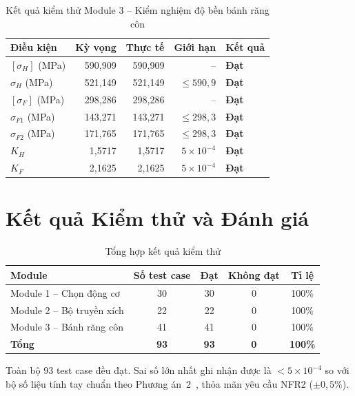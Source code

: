 \begin{table}[H]
  \centering
  \caption{Kết quả kiểm thử Module 3 -- Kiểm nghiệm độ bền bánh răng côn}
  \label{tab:test-m3-strength}
  \begin{tabular}{lrrrl}
    \toprule
    \textbf{Điều kiện} & \textbf{Kỳ vọng} & \textbf{Thực tế} & \textbf{Giới hạn} & \textbf{Kết quả} \\
    \midrule
    $[\sigma_H]$ (MPa) & 590,909 & 590,909 & -- & \textbf{Đạt} \\
    $\sigma_H$ (MPa) & 521,149 & 521,149 & $\leq 590{,}9$ & \textbf{Đạt} \\
    $[\sigma_F]$ (MPa) & 298,286 & 298,286 & -- & \textbf{Đạt} \\
    $\sigma_{F1}$ (MPa) & 143,271 & 143,271 & $\leq 298{,}3$ & \textbf{Đạt} \\
    $\sigma_{F2}$ (MPa) & 171,765 & 171,765 & $\leq 298{,}3$ & \textbf{Đạt} \\
    $K_H$ & 1,5717 & 1,5717 & $5\times10^{-4}$ & \textbf{Đạt} \\
    $K_F$ & 2,1625 & 2,1625 & $5\times10^{-4}$ & \textbf{Đạt} \\
    \bottomrule
  \end{tabular}
\end{table}

\section{Kết quả Kiểm thử và Đánh giá}
\label{sec:test-results}

\begin{table}[H]
  \centering
  \caption{Tổng hợp kết quả kiểm thử}
  \label{tab:test-summary}
  \begin{tabular}{lcccc}
    \toprule
    \textbf{Module} & \textbf{Số test case} & \textbf{Đạt} & \textbf{Không đạt} & \textbf{Tỉ lệ} \\
    \midrule
    Module 1 -- Chọn động cơ & 30 & 30 & 0 & 100\% \\
    Module 2 -- Bộ truyền xích & 22 & 22 & 0 & 100\% \\
    Module 3 -- Bánh răng côn & 41 & 41 & 0 & 100\% \\
    \midrule
    \textbf{Tổng} & \textbf{93} & \textbf{93} & \textbf{0} & \textbf{100\%} \\
    \bottomrule
  \end{tabular}
\end{table}

Toàn bộ 93 test case đều đạt.
Sai số lớn nhất ghi nhận được là $< 5 \times 10^{-4}$
so với bộ số liệu tính tay chuẩn theo Phương án~2~\cite{LeNhatTruong2026},
thỏa mãn yêu cầu NFR2 ($\pm 0{,}5\%$).


